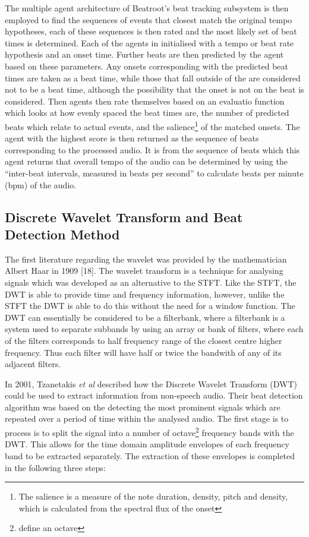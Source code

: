 \documentclass[a4paper, 11pt]{article}
\begin{document}
The multiple agent architecture of Beatroot's beat tracking subsystem is then employed to find the sequences of events that closest match the original tempo hypotheses, each of these sequences is then rated and the most likely set of beat times is determined. Each of the agents in initialised with a tempo or beat rate hypothesis and an onset time. Further beats are then predicted by the agent based on these parameters. Any onsets corresponding with the predicted beat times are taken as a beat time, while those that fall outside of the are considered not to be a beat time, although the possibility that the onset is not on the beat is considered. Then agents then rate themselves based on an evaluatio function which looks at how evenly spaced the beat times are, the number of predicted beats which relate to actual events, and the salience\footnote{The salience is a measure of the note duration, density, pitch and density\cite{dixon1}, which is calculated from the spectral flux of the onset\cite{dixon4}} of the matched onsets. The agent with the highest score is then returned as the sequence of beats corresponding to the processed audio\cite{dixon4}. It is from the sequence of beats which this agent returns that overall tempo of the audio can be determined by using the ``inter-beat intervals, measured in beats per second''\cite{dixon1} to calculate beats per minute (bpm) of the audio.


\subsection{Discrete Wavelet Transform and Beat Detection Method}
The first literature regarding the wavelet was provided by the mathematician Albert Haar in 1909 [18]. The wavelet transform is a technique for analysing signals which was developed as an alternative to the STFT\cite{tzane1}. Like the STFT, the DWT is able to provide time and frequency information, however, unlike the STFT the DWT is able to do this without the need for a window function. The DWT can essentially be considered to be a filterbank, where a filterbank is a system used to separate subbands by using an array or bank of filters, where each of the filters corresponds to half frequency range of the closest centre higher frequency. Thus each filter will have half or twice the bandwith of any of its adjacent filters. 

In 2001, Tzanetakis \textit{et al} described how the Discrete Wavelet Transform (DWT) could be used to extract information from non-speech audio\cite{tzane1}. Their beat detection algorithm was based on the detecting the most prominent signals which are repeated over a period of time within the analysed audio. The first stage is to process is to split the signal into a number of octave\footnote{define an octave} frequency bands with the DWT. This allows for the time domain amplitude envelopes of each frequency band to be extracted separately. The extraction of these envelopes is completed in the following three steps:
\end{document}
